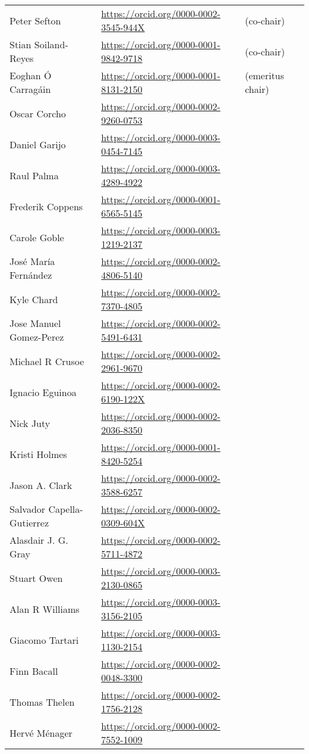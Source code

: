 \begin{longtable}{lll}
  Peter Sefton & \url{https://orcid.org/0000-0002-3545-944X} & (co-chair) 
\\
  Stian Soiland-Reyes & \url{https://orcid.org/0000-0001-9842-9718} & (co-chair) 
\\
  Eoghan Ó Carragáin & \url{https://orcid.org/0000-0001-8131-2150} & (emeritus chair) 
\\
  Oscar Corcho & \url{https://orcid.org/0000-0002-9260-0753}
\\
  Daniel Garijo & \url{https://orcid.org/0000-0003-0454-7145}
\\
  Raul Palma & \url{https://orcid.org/0000-0003-4289-4922}
\\
  Frederik Coppens & \url{https://orcid.org/0000-0001-6565-5145}
\\
  Carole Goble & \url{https://orcid.org/0000-0003-1219-2137}
\\
  José María Fernández & \url{https://orcid.org/0000-0002-4806-5140}
\\
  Kyle Chard & \url{https://orcid.org/0000-0002-7370-4805}
\\
  Jose Manuel Gomez-Perez & \url{https://orcid.org/0000-0002-5491-6431}
\\
  Michael R Crusoe & \url{https://orcid.org/0000-0002-2961-9670}
\\
  Ignacio Eguinoa & \url{https://orcid.org/0000-0002-6190-122X}
\\
  Nick Juty & \url{https://orcid.org/0000-0002-2036-8350}
\\
  Kristi Holmes & \url{https://orcid.org/0000-0001-8420-5254}
\\
  Jason A. Clark & \url{https://orcid.org/0000-0002-3588-6257}
\\
  Salvador Capella-Gutierrez & \url{https://orcid.org/0000-0002-0309-604X}
\\
  Alasdair J. G. Gray & \url{https://orcid.org/0000-0002-5711-4872}
\\
  Stuart Owen & \url{https://orcid.org/0000-0003-2130-0865}
\\
  Alan R Williams & \url{https://orcid.org/0000-0003-3156-2105}
\\
  Giacomo Tartari & \url{https://orcid.org/0000-0003-1130-2154}
\\
  Finn Bacall & \url{https://orcid.org/0000-0002-0048-3300}
\\
  Thomas Thelen & \url{https://orcid.org/0000-0002-1756-2128}
\\
  Hervé Ménager & \url{https://orcid.org/0000-0002-7552-1009}

\end{longtable}
